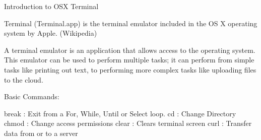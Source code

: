 Introduction to OSX Terminal

Terminal (Terminal.app) is the terminal emulator included in the OS X operating system by Apple. (Wikipedia)

A terminal emulator is an application that allows access to the operating system. This emulator can be used to perform multiple tasks; it can perform from simple tasks like printing out text, to performing more complex tasks like uploading files to the cloud.

Basic Commands:

break : Exit from a For, While, Until or Select loop.
cd : Change Directory
chmod : Change access permissions
clear : Clears terminal screen
curl : Transfer data  from or to a server

